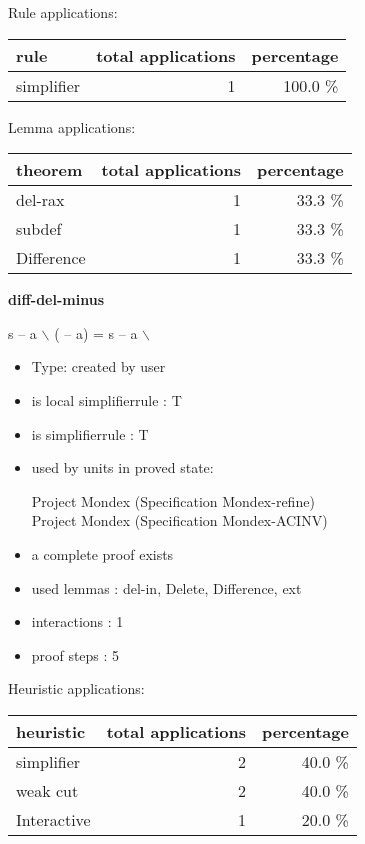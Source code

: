 \documentclass[a4paper]{article}
\begin{document}
Rule applications:

\begin{supertabular}{l|r|r}
rule	        & total applications & percentage \\ \hline
simplifier & 1 & 100.0 \% \\

\end{supertabular}

Lemma applications:

\begin{supertabular}{l|r|r}
theorem	        & total applications & percentage \\ \hline
del-rax & 1 & 33.3 \% \\
subdef & 1 & 33.3 \% \\
Difference & 1 & 33.3 \% \\

\end{supertabular}
\pagebreak

{\LARGE\bf diff-del-minus}\label{lemma-diff-del-minus}

\medskip

 \Fol s -- a $\backslash$ ( -- a) = s -- a $\backslash$ 

\begin{itemize}

\item Type: created by user

\item is local simplifierrule : T
\item is simplifierrule : T
\item used by units in proved state:

Project Mondex (Specification Mondex-refine) \\
Project Mondex (Specification Mondex-ACINV)
\item       a complete proof exists
\item       used lemmas  : del-in, Delete, Difference, ext
\item       interactions : 1
\item       proof steps  : 5
\end{itemize}

\medskip


Heuristic applications:

\begin{supertabular}{l|r|r}
heuristic	& total applications & percentage \\ \hline
simplifier & 2 & 40.0 \% \\
weak cut & 2 & 40.0 \% \\
Interactive & 1 & 20.0 \% \\

\end{supertabular}
\end{document}
